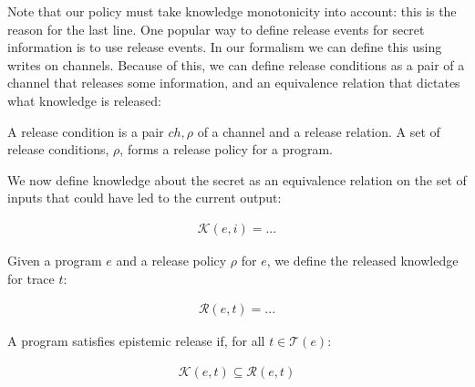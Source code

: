 \documentclass[conference]{IEEEtran}
\theoremstyle{definition}
\newcommand{\traces}[1]{\mathcal{T}(#1)}
\newcommand{\tr}{t\xspace}
\begin{document}
Note that our policy must take knowledge monotonicity into account:
this is the reason for the last line.  One popular way to define
release events for secret information is to use release events.  In
our formalism we can define this using writes on channels.  Because of
this, we can define release conditions as a pair of a channel that
releases some information, and an equivalence relation that dictates
what knowledge is released:

\begin{Definition}
  A release condition is a pair $ch, \rho$ of a channel and a release
  relation.  A set of release conditions, $\rho$, forms a release
  policy for a program.
\end{Definition}

We now define knowledge about the secret as an equivalence relation on
the set of inputs that could have led to the current output:

\begin{Definition}[$\mathcal{K}(e,\tr)$]
  \begin{displaymath}
    \begin{array}{l}
      \mathcal{K}(e,i) = ...
    \end{array}
  \end{displaymath}
\end{Definition}

\begin{Definition}[$\mathcal{R}(e,\tr,\rho)$]
  Given a program $e$ and a release policy $\rho$ for $e$, we define
  the released knowledge for trace $\tr$:

  \begin{displaymath}
    \begin{array}{l}
      \mathcal{R}(e,\tr) = ...
    \end{array}
  \end{displaymath}
\end{Definition}

\begin{Definition}
  \label{defn:epistemic-release}
  A program satisfies epistemic release if, for all $\tr \in \traces{e}$:

  \begin{displaymath}
    \begin{array}{l}
      \mathcal{K}(e,\tr) \subseteq \mathcal{R}(e,\tr)
    \end{array}
  \end{displaymath}
\end{Definition}
\end{document}
